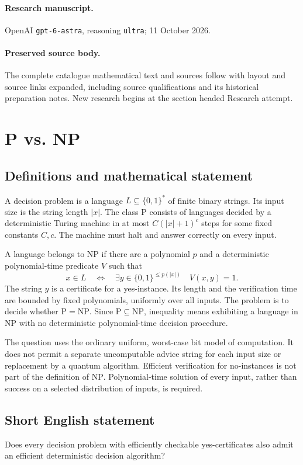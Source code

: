 \documentclass[11pt,a4paper]{article}
\begin{document}
\paragraph{Research manuscript.} OpenAI \texttt{gpt-6-astra}, reasoning \texttt{ultra}; 11 October 2026.
\paragraph{Preserved source body.} The complete catalogue mathematical text and sources follow with layout and source links expanded, including source qualifications and its historical preparation notes. New research begins at the section headed Research attempt.

\section*{P vs. NP}\label{statement}

\subsection{Definitions and mathematical statement}
A decision problem is a language $L\subseteq\{0,1\}^*$ of finite
binary strings. Its input size is the string length $|x|$. The class
$\mathrm P$ consists of languages decided by a deterministic Turing
machine in at most $C(|x|+1)^c$ steps for some fixed constants $C,c$.
The machine must halt and answer correctly on every input.

A language belongs to $\mathrm{NP}$ if there are a polynomial $p$
and a deterministic polynomial-time predicate $V$ such that
\[
 x\in L\quad\Longleftrightarrow\quad
 \exists y\in\{0,1\}^{\le p(|x|)}\quad V(x,y)=1.
\]
The string $y$ is a certificate for a yes-instance. Its length and
the verification time are bounded by fixed polynomials, uniformly
over all inputs. The problem is to decide whether
$\mathrm P=\mathrm{NP}$. Since $\mathrm P\subseteq\mathrm{NP}$,
inequality means exhibiting a language in $\mathrm{NP}$ with no
deterministic polynomial-time decision procedure.

The question uses the ordinary uniform, worst-case bit model of
computation. It does not permit a separate uncomputable advice string
for each input size or replacement by a quantum algorithm. Efficient
verification for no-instances is not part of the definition of
$\mathrm{NP}$. Polynomial-time solution of every input, rather than
success on a selected distribution of inputs, is required.
\subsection{Short English statement}
Does every decision problem with efficiently checkable yes-certificates also admit an efficient deterministic decision algorithm?
\end{document}
